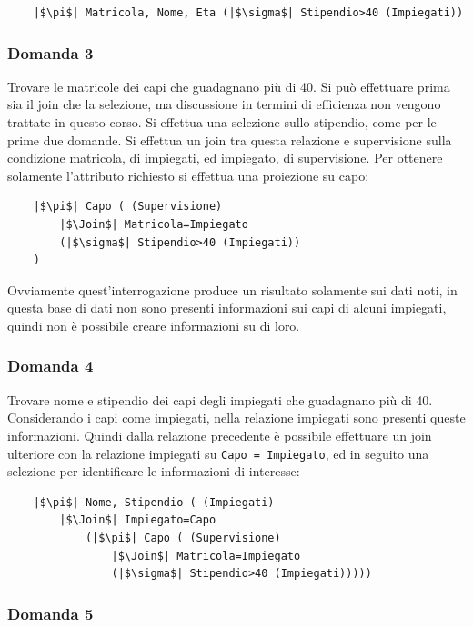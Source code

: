 \documentclass{article}
\numberwithin{equation}{subsection}
\begin{document}
\begin{verbatim}
    |$\pi$| Matricola, Nome, Eta (|$\sigma$| Stipendio>40 (Impiegati))
\end{verbatim}

\subsubsection*{Domanda 3}

Trovare le matricole dei capi che guadagnano più di 40. Si può effettuare prima sia il join che la selezione, ma discussione in termini di efficienza non vengono trattate in questo corso. Si effettua una selezione 
sullo stipendio, come per le prime due domande. Si effettua un join tra questa relazione e supervisione sulla condizione matricola, di impiegati, ed impiegato, di supervisione. Per ottenere solamente l'attributo 
richiesto si effettua una proiezione su capo:
\begin{verbatim}
    |$\pi$| Capo ( (Supervisione)
        |$\Join$| Matricola=Impiegato
        (|$\sigma$| Stipendio>40 (Impiegati))
    )
\end{verbatim}

Ovviamente quest'interrogazione produce un risultato solamente sui dati noti, in questa base di dati non sono presenti informazioni sui capi di alcuni impiegati, quindi non è possibile creare informazioni su di loro. 

\subsubsection*{Domanda 4}
Trovare nome e stipendio dei capi degli impiegati che guadagnano più di 40. Considerando i capi come impiegati, nella relazione impiegati sono presenti queste informazioni. Quindi dalla relazione precedente è possibile 
effettuare un join ulteriore con la relazione impiegati su \verb|Capo = Impiegato|, ed in seguito una selezione per identificare le informazioni di interesse:
\begin{verbatim}
    |$\pi$| Nome, Stipendio ( (Impiegati)
        |$\Join$| Impiegato=Capo 
            (|$\pi$| Capo ( (Supervisione)
                |$\Join$| Matricola=Impiegato
                (|$\sigma$| Stipendio>40 (Impiegati)))))
\end{verbatim}

\subsubsection*{Domanda 5}
\end{document}
